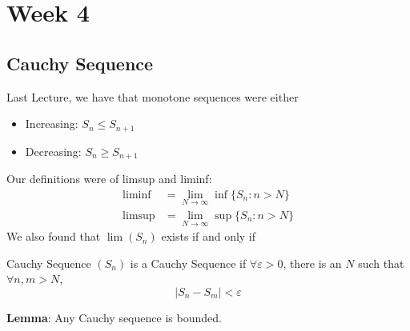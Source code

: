 \documentclass{report}
\begin{document}
\chapter{Week 4}

\begin{topic}
    \section{Cauchy Sequence}
\end{topic}

Last Lecture, we have that monotone sequences were either
    \begin{itemize}
        \item Increasing: $S_{n} \leq S_{n + 1}$

        \item Decreasing: $S_{n} \geq S_{n + 1}$ 
    \end{itemize}
Our definitions were of limsup and liminf:
    \begin{align*}
        \liminf  &= \lim \limits_{N \to \infty} \inf \{S_{n}: n > N\}  \\
        \limsup  &= \lim \limits_{N \to \infty} \sup \{S_{n} : n > N\}   
    \end{align*}
We also found that $\lim(S_{n})$ exists if and only if 

\begin{definition}{Cauchy Sequence}
    $(S_{n})$ is a Cauchy Sequence if $\forall \varepsilon > 0$, there is an $N$ such that $\forall n, m > N$, 
        \begin{equation*}
            \lvert S_{n} - S_{m} \rvert < \varepsilon
        \end{equation*}
\end{definition}

\textbf{Lemma}: Any Cauchy sequence is bounded.
\end{document}
